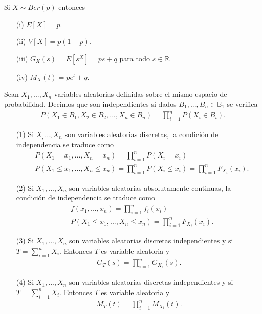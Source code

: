 \begin{obs}
Si $X \sim Ber(p)$ entonces
\begin{enumerate}
    \item[(i)] $E[X] = p$.
    \item[(ii)] $V[X] = p(1 - p)$.
    \item[(iii)] $G_X(s) = E[s^X] = ps + q$ para todo $s \in \mathbb{R}$.
    \item[(iv)] $M_X(t) = pe^t + q$.
\end{enumerate}
\end{obs}

\begin{defi}
Sean $X_1,...,X_n$ variables aleatorias definidas sobre el mismo espacio de probabilidad. Decimos que son independientes si dados $B_1,...,B_n \in \mathbb{B}_1$ se verifica
\begin{align*}
    P(X_1 \in B_1, X_2 \in B_2, ..., X_n \in B_n) = \prod_{i=1}^{n}{P(X_i \in B_i)}.
\end{align*}
\end{defi}

\begin{obs}
\begin{enumerate}
    \item[(1)] Si $X_,...,X_n$ son variables aleatorias discretas, la condición de independencia se traduce como
    \begin{align*}
        &P(X_1 = x_1, ..., X_n = x_n) = \prod_{i=1}^{n}{P(X_i = x_i)} \\
        &P(X_1 \leq x_1,...,X_n \leq x_n) = \prod_{i=1}^{n}{P(X_i \leq x_i)} = \prod_{i=1}^{n}{F_{X_i}(x_i)}.
    \end{align*}
    \item[(2)] Si $X_1,...,X_n$ son variables aleatorias absolutamente continuas, la condición de independencia se traduce como
    \begin{align*}
        &f(x_1,...,x_n) = \prod_{i=1}^{n}{f_i(x_i)} \\
        &P(X_1 \leq x_1,...,X_n \leq x_n) = \prod_{i=1}^{n}{F_{X_i}(x_i)}.
    \end{align*}
    \item[(3)] Si $X_1,...,X_n$ son variables aleatorias discretas independientes y si $T = \sum_{i=1}^{n}{X_i}$. Entonces $T$ es variable aleatoria y 
    \begin{align*}
        G_T(s) = \prod_{i=1}^{n}{G_{X_i}(s)}.
    \end{align*}
    \item[(4)] Si $X_1,...,X_n$ son variables aleatorias discretas independientes y si $T = \sum_{i=1}^{n}{X_i}$. Entonces $T$ es variable aleatoria y 
    \begin{align*}
        M_T(t) = \prod_{i=1}^{n}{M_{X_i}(t)}.
    \end{align*}
\end{enumerate}
\end{obs}

